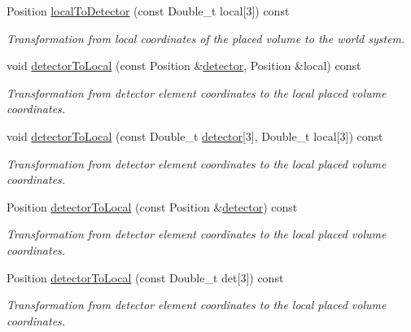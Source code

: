 \begin{DoxyCompactItemize}
Position \hyperlink{class_d_d4hep_1_1_alignments_1_1_alignment_data_ad3c8fd50d266be9b24501058cddd920e}{localToDetector} (const Double\_\-t local\mbox{[}3\mbox{]}) const 
\begin{DoxyCompactList}\small\item\em Transformation from local coordinates of the placed volume to the world system. \item\end{DoxyCompactList}\item 
void \hyperlink{class_d_d4hep_1_1_alignments_1_1_alignment_data_a8b451ea84d324b3c37f6569d6fd86062}{detectorToLocal} (const Position \&\hyperlink{class_d_d4hep_1_1_alignments_1_1_alignment_data_abf7096d1f2d3ed307c361f2d6d03710e}{detector}, Position \&local) const 
\begin{DoxyCompactList}\small\item\em Transformation from detector element coordinates to the local placed volume coordinates. \item\end{DoxyCompactList}\item 
void \hyperlink{class_d_d4hep_1_1_alignments_1_1_alignment_data_a09f3122d269494dd949cc20d141b3fd2}{detectorToLocal} (const Double\_\-t \hyperlink{class_d_d4hep_1_1_alignments_1_1_alignment_data_abf7096d1f2d3ed307c361f2d6d03710e}{detector}\mbox{[}3\mbox{]}, Double\_\-t local\mbox{[}3\mbox{]}) const 
\begin{DoxyCompactList}\small\item\em Transformation from detector element coordinates to the local placed volume coordinates. \item\end{DoxyCompactList}\item 
Position \hyperlink{class_d_d4hep_1_1_alignments_1_1_alignment_data_aae374197c44e2d8040f3f3f400a95056}{detectorToLocal} (const Position \&\hyperlink{class_d_d4hep_1_1_alignments_1_1_alignment_data_abf7096d1f2d3ed307c361f2d6d03710e}{detector}) const 
\begin{DoxyCompactList}\small\item\em Transformation from detector element coordinates to the local placed volume coordinates. \item\end{DoxyCompactList}\item 
Position \hyperlink{class_d_d4hep_1_1_alignments_1_1_alignment_data_aa86d5fc9e8c8046b2d42451f6911794f}{detectorToLocal} (const Double\_\-t det\mbox{[}3\mbox{]}) const 
\begin{DoxyCompactList}\small\item\em Transformation from detector element coordinates to the local placed volume coordinates. \item\end{DoxyCompactList}\end{DoxyCompactItemize}
